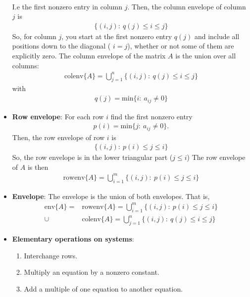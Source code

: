 \documentclass{report}
\begin{document}
\begin{itemize}
\begin{align*}
        \end{align*}
        I.e the first nonzero entry in column $j$. Then, the column envelope of column $j$ is 
        \begin{align*}
            \{(i,j):\ q(j) \leq i \leq j\}
        \end{align*}
        So, for column $j$, you start at the first nonzero entry $q(j)$ and include all positions down to the diagonal ( $i=j$), whether or not some of them are explicitly zero.
        \bigbreak \noindent 
        The column envelope of the matrix $A$ is the union over all columns:
        \begin{align*}
            \text{colenv}\{A\} = \bigcup_{j=1}^{n}\{(i,j):\ q(j) \leq i \leq j\}
        \end{align*}
        with 
        \begin{align*}
            q(j) = \text{min}\{i:\ a_{ij} \ne 0\}
        \end{align*}
    \item \textbf{Row envelope}: For each row $i$ find the first nonzero entry
        \begin{align*}
            p(i) = \text{min}\{j:\ a_{ij} \ne 0\}.
        \end{align*}
        Then, the row envelope of row $i$ is 
        \begin{align*}
            \{(i,j):\ p(i) \leq j \leq i\}
        \end{align*}
        So, the row envelope is in the lower triangular part ($j \leq i $)
        \bigbreak \noindent 
        The row envelope of $A$ is then
        \begin{align*}
            \text{rowenv}\{A\} = \bigcup_{i=1}^{m}\{(i,j):\ p(i) \leq j \leq i\}
        \end{align*}
    \item \textbf{Envelope}: The envelope is the union of both envelopes. That is,
        \begin{align*}
            \text{env}\{A\} = &\text{rowenv}\{A\} = \bigcup_{i=1}^{m}\{(i,j):\ p(i) \leq j \leq i\}  \\
            \cup &\text{colenv}\{A\} = \bigcup_{j=1}^{n}\{(i,j):\ q(j) \leq i \leq j\}
        \end{align*}
    \item \textbf{Elementary operations on systems}:
        \begin{enumerate}
            \item Interchange rows.
            \item Multiply an equation by a nonzero constant.
            \item Add a multiple of one equation to another equation.
        \end{enumerate}


\end{itemize}
\end{document}
